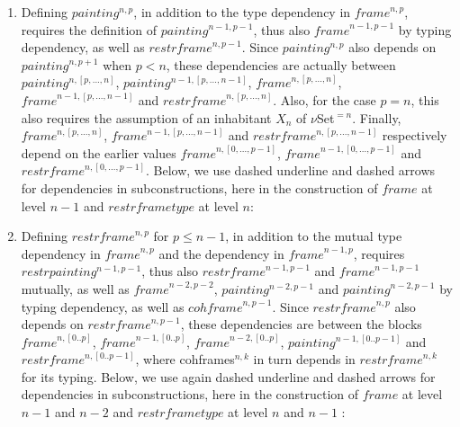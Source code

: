 \documentclass[a4paper,english,cleveref,autoref,thm-restate]{article}
\newcommand{\myframe}{\mathit{frame}}
\newcommand{\painting}{\mathit{painting}}
\newcommand{\restrframe}{\mathit{restrframe}}
\newcommand{\restrframetype}{\mathit{restrframetype}}
\newcommand{\restrpainting}{\mathit{restrpainting}}
\newcommand{\cohframe}{\mathit{cohframe}}
\newcommand{\udensdash}[1]{%
    \tikz[baseline=(todotted.base)]{
        \node[inner sep=1pt,outer sep=0pt] (todotted) {$#1$};
        \draw[densely dashed] (todotted.south west) -- (todotted.south east);
    }%
}%
\begin{document}
\begin{enumerate}
\item Defining $\painting^{n,p}$, in addition to the type dependency
  in $\myframe^{n,p}$, requires the definition of
  $\painting^{n-1,p-1}$, thus also $\myframe^{n-1,p-1}$ by typing
  dependency, as well as $\restrframe^{n,p-1}$. Since
  $\painting^{n,p}$ also depends on $\painting^{n,p+1}$ when $p<n$,
  these dependencies are actually between $\painting^{n,[p,...,n]}$,
  $\painting^{n-1,[p,...,n-1]}$, $\myframe^{n,[p,...,n]}$,
  $\myframe^{n-1,[p,...,n-1]}$ and $\restrframe^{n,[p,...,n]}$. Also,
  for the case $p=n$, this also requires the assumption of an
  inhabitant $X_{n}$ of $\nu$Set$^{=n}$. Finally,
  $\myframe^{n,[p,...,n]}$, $\myframe^{n-1,[p,...,n-1]}$ and
  $\restrframe^{n,[p,...,n-1]}$ respectively depend on the earlier
  values $\myframe^{n,[0,...,p-1]}$, $\myframe^{n-1,[0,...,p-1]}$ and
  $\restrframe^{n,[0,...,p-1]}$.  Below, we use dashed underline and
  dashed arrows for dependencies in subconstructions, here in the
  construction of $\myframe$ at level $n-1$ and $\restrframetype$ at
  level $n$:
\begin{center}
\end{center}

\item Defining $\restrframe^{n,p}$ for $p\leq n-1$, in addition to the
  mutual type dependency in $\myframe^{n,p}$ and the dependency in
  $\myframe^{n-1,p}$, requires $\restrpainting^{n-1,p-1}$, thus also
  $\restrframe^{n-1,p-1}$ and $\myframe^{n-1,p-1}$ mutually, as well
  as $\myframe^{n-2,p-2}$, $painting^{n-2,p-1}$ and
  $\painting^{n-2,p-1}$ by typing dependency, as well as
  $\cohframe^{n,p-1}$. Since $\restrframe^{n,p}$ also depends on
  $\restrframe^{n,p-1}$, these dependencies are between the blocks
  $\myframe^{n,[0..p]}$, $\myframe^{n-1,[0..p]}$,
  $\myframe^{n-2,[0..p]}$, $\painting^{n-1,[0..p-1]}$ and
  $\restrframe^{n,[0..p-1]}$, where cohframes$^{n,k}$ in turn depends
  in $\restrframe^{n,k}$ for its typing. Below, we use again dashed
  underline and dashed arrows for dependencies in subconstructions,
  here in the construction of $\myframe$ at level $n-1$ and $n-2$ and $\restrframetype$ at level $n$ and $n-1$ :


\end{enumerate}
\end{document}
